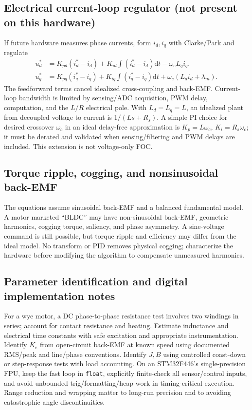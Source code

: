 \documentclass[10pt,letterpaper]{article}
\newcommand{\dd}{\mathrm{d}}
\begin{document}
\subsection{Electrical current-loop regulator (not present on this hardware)}
If future hardware measures phase currents, form $i_d,i_q$ with Clarke/Park and regulate
\begin{equation}
\begin{aligned}
u_d^*&=K_{pd}(i_d^*-i_d)+K_{id}\!\int(i_d^*-i_d)\dd t-\omega_eL_qi_q,\\
u_q^*&=K_{pq}(i_q^*-i_q)+K_{iq}\!\int(i_q^*-i_q)\dd t+\omega_e(L_di_d+\lambda_m).
\end{aligned}
\end{equation}
The feedforward terms cancel idealized cross-coupling and back-EMF. Current-loop bandwidth is limited by sensing/ADC acquisition, PWM delay, computation, and the $L/R$ electrical pole. With $L_d=L_q=L$, an idealized plant from decoupled voltage to current is $1/(Ls+R_s)$. A simple PI choice for desired crossover $\omega_c$ in an ideal delay-free approximation is $K_p=L\omega_c$, $K_i=R_s\omega_c$; it must be derated and validated when sensing/filtering and PWM delays are included. This extension is not voltage-only FOC.

\subsection{Torque ripple, cogging, and nonsinusoidal back-EMF}
The equations assume sinusoidal back-EMF and a balanced fundamental model. A motor marketed ``BLDC'' may have non-sinusoidal back-EMF, geometric harmonics, cogging torque, saliency, and phase asymmetry. A sine-voltage command is still possible, but torque ripple and efficiency may differ from the ideal model. No transform or PID removes physical cogging; characterize the hardware before modifying the algorithm to compensate unmeasured harmonics.

\subsection{Parameter identification and digital implementation notes}
For a wye motor, a DC phase-to-phase resistance test involves two windings in series; account for contact resistance and heating. Estimate inductance and electrical time constants with safe excitation and appropriate instrumentation. Identify $K_e$ from open-circuit back-EMF at known speed using documented RMS/peak and line/phase conventions. Identify $J,B$ using controlled coast-down or step-response tests with load accounting. On an STM32F446's single-precision FPU, keep the fast loop in \texttt{float}, explicitly finite-check all sensor/control inputs, and avoid unbounded trig/formatting/heap work in timing-critical execution. Range reduction and wrapping matter to long-run precision and to avoiding catastrophic angle discontinuities.
\end{document}
